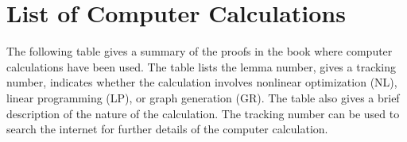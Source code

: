 %
%



\section{List of Computer Calculations}

The following table gives a summary of the proofs in the book where
computer calculations have been used.  The table lists the lemma
number, gives a tracking number, indicates whether the calculation
involves nonlinear optimization (NL), linear programming (LP), or
graph generation (GR).  The table also gives a brief description of
the nature of the calculation.  The tracking number can be used to
search the internet for further details of the computer calculation.


